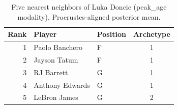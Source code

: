 \begin{table}[htbp]
  \centering\small
  \begin{tabular}{rllc}
    \toprule
    Rank & Player & Position & Archetype \\
    \midrule
    1 & Paolo Banchero & F & 1 \\
    2 & Jayson Tatum & F & 1 \\
    3 & RJ Barrett & G & 1 \\
    4 & Anthony Edwards & G & 1 \\
    5 & LeBron James & G & 2 \\
    \bottomrule
  \end{tabular}
  \caption{Five nearest neighbors of Luka Doncic (peak_age modality), Procrustes-aligned posterior mean.}
  \label{tab:Luka_Doncic_neighbors_peak_age}
\end{table}

